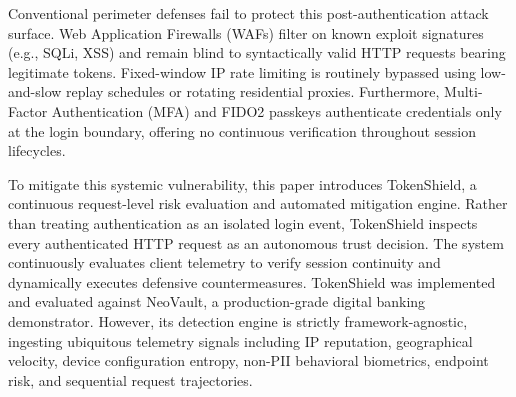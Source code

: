 \documentclass[conference]{IEEEtran}
\begin{document}
Conventional perimeter defenses fail to protect this post-authentication attack surface. Web Application Firewalls (WAFs) filter on known exploit signatures (e.g., SQLi, XSS) and remain blind to syntactically valid HTTP requests bearing legitimate tokens. Fixed-window IP rate limiting is routinely bypassed using low-and-slow replay schedules or rotating residential proxies. Furthermore, Multi-Factor Authentication (MFA) and FIDO2 passkeys authenticate credentials only at the login boundary, offering no continuous verification throughout session lifecycles.

To mitigate this systemic vulnerability, this paper introduces TokenShield, a continuous request-level risk evaluation and automated mitigation engine. Rather than treating authentication as an isolated login event, TokenShield inspects every authenticated HTTP request as an autonomous trust decision. The system continuously evaluates client telemetry to verify session continuity and dynamically executes defensive countermeasures. TokenShield was implemented and evaluated against NeoVault, a production-grade digital banking demonstrator. However, its detection engine is strictly framework-agnostic, ingesting ubiquitous telemetry signals including IP reputation, geographical velocity, device configuration entropy, non-PII behavioral biometrics, endpoint risk, and sequential request trajectories.
\end{document}
